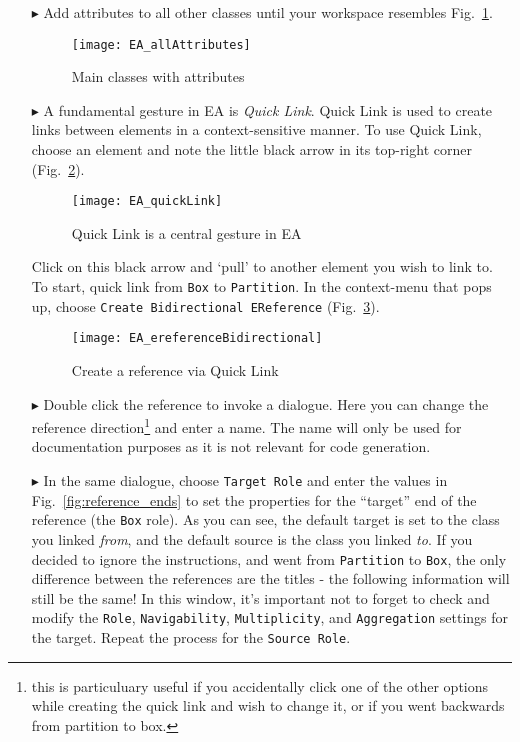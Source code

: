 \begin{itemize}
\pagebreak

\item[$\blacktriangleright$] Add attributes to all other classes until your workspace resembles Fig.~\ref{fig:attribute_completed}.

\begin{figure}[htbp]
	\centering
  \texttt{[image: EA\_allAttributes]}
	\caption{Main classes with attributes}
	\label{fig:attribute_completed}
\end{figure}
\FloatBarrier


\item[$\blacktriangleright$] A fundamental gesture in EA is \emph{Quick Link}. Quick Link is used to create links between elements in a context-sensitive
manner. To use Quick Link, choose an element and note the little black arrow in its top-right corner (Fig.~\ref{fig:quicklink}).

\begin{figure}[htbp]
	\centering
  \texttt{[image: EA\_quickLink]}
	\caption{Quick Link is a central gesture in EA}
	\label{fig:quicklink}
\end{figure}
\FloatBarrier

\pagebreak

Click on this black arrow and `pull' to another element you wish to link to. To start, quick link from \texttt{Box} to \texttt{Partition}. In the context-menu
that pops up, choose \texttt{Create Bidirectional EReference} (Fig.~\ref{fig:ereference}).

\begin{figure}[htbp]
	\centering
  \texttt{[image: EA\_ereferenceBidirectional]}
	\caption{Create a reference via Quick Link}
	\label{fig:ereference}
\end{figure}
\FloatBarrier

\item[$\blacktriangleright$] Double click the reference to invoke a dialogue. Here you can change the reference direction\footnote{this is particuluary useful
if you accidentally click one of the other options while creating the quick link and wish to change it, or if you went backwards from partition to box.} and
enter a name. The name will only be used for documentation purposes as it is not relevant for code generation.

\item[$\blacktriangleright$] In the same dialogue, choose \texttt{Target Role} and enter the values in Fig.~\ref{fig:reference_ends} to set the properties for
the ``target'' end of the reference (the \texttt{Box} role). As you can see, the default target is set to the class you linked \emph{from}, and the default
source is the class you linked \emph{to}. If you decided to ignore the instructions, and went from \texttt{Partition} to \texttt{Box}, the only difference
between the references are the titles - the following information will still be the same! In this window, it's important not to forget to check and modify the
\texttt{Role}, \texttt{Navigability}, \texttt{Multiplicity}, and \texttt{Aggregation} settings for the target.  Repeat the process for the \texttt{Source Role}.


\end{itemize}
